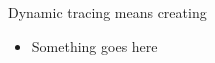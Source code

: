 \documentclass{beamer}
\begin{document}
\begin{frame}
    Dynamic tracing means creating
    \begin{itemize}
        \item Something goes here
    \end{itemize}
\end{frame}

%
%
\end{document}
